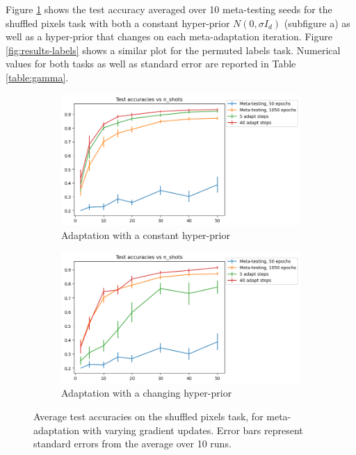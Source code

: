 \documentclass[letterpaper]{article} %
\theoremstyle{definition}
\begin{document}
Figure \ref{fig:results-pixels} shows the test accuracy averaged over 10 meta-testing seeds for the shuffled pixels task with both a constant hyper-prior $N(0,\sigma I_d)$ (subfigure a) as well as a hyper-prior that changes on each meta-adaptation iteration. Figure \ref{fig:results-labels} shows a similar plot for the permuted labels task. 
Numerical values for both tasks as well as standard error are reported in Table \ref{table:gamma}.


\begin{figure}[h!]
	\centering
	\begin{subfigure}[b]{0.45\textwidth}
		\centering
		\includegraphics[width=\textwidth]{test_accuracies_pixels_const}
		\caption{Adaptation with a constant hyper-prior}
	\end{subfigure}
	\hfill
	\begin{subfigure}[b]{0.45\textwidth}
		\centering
		\includegraphics[width=\textwidth]{test_accuracies_pixels_var}
		\caption{Adaptation with a changing hyper-prior}	 	
	\end{subfigure}
	\hfill
	\caption{Average test accuracies on the shuffled pixels task, for meta-adaptation with varying gradient updates. Error bars represent standard errors from the average over 10 runs.}	 
	\label{fig:results-pixels}
\end{figure}
\end{document}
